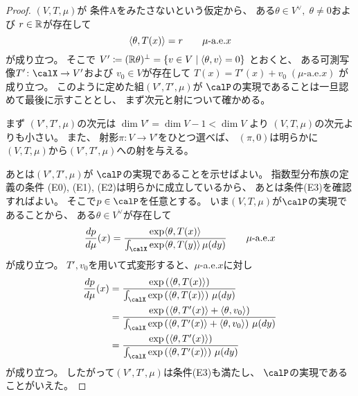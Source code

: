 \documentclass[report]{jlreq}
\begin{document}
\begin{proof}
    $(V, T, \mu)$が
    条件Aをみたさないという仮定から、
    ある$\theta \in V^\vee, \; \theta \neq 0$および
    $r \in \mathbb{R}$が存在して
    \begin{equation}
        \locallabel{eq:costant-pairing}
        \langle \theta, T(x) \rangle
            = r
            \qquad
            \text{$\mu$-a.e.$x$}
    \end{equation}
    が成り立つ。
    そこで
    $V' \coloneqq (\mathbb{R}\theta)^\perp
        = \{ v \in V \mid \langle \theta, v \rangle = 0 \}$
    とおくと、
    ある可測写像$T' \colon \calX \to V'$および
    $v_0 \in V$が存在して
    $T(x) = T'(x) + v_0 \; (\text{$\mu$-a.e.$x$})$
    が成り立つ。
    このように定めた組$(V', T', \mu)$が
    $\calP$の実現であることは一旦認めて最後に示すこととし、
    まず次元と射について確かめる。

    まず
    $(V', T', \mu)$の次元は
    $\dim V' = \dim V - 1 < \dim V$
    より
    $(V, T, \mu)$の次元よりも小さい。
    また、
    射影$\pi \colon V \to V'$をひとつ選べば、
    $(\pi, 0)$は明らかに
    $(V, T, \mu)$から$(V', T', \mu)$への射を与える。

    あとは$(V', T', \mu)$が
    $\calP$の実現であることを示せばよい。
    指数型分布族の定義の条件
    (E0), (E1), (E2)は明らかに成立しているから、
    あとは条件(E3)を確認すればよい。
    そこで$p \in \calP$を任意とする。
    いま$(V, T, \mu)$が$\calP$の実現であることから、
    ある$\theta \in V^\vee$が存在して
    \begin{equation}
        \dd[p]{\mu}(x)
            = \frac{
                \exp\langle \theta, T(x) \rangle
            }{
                \int_{\calX} \exp\langle \theta, T(y) \rangle \, \mu(dy)
            }
            \qquad
            \text{$\mu$-a.e.$x$}
    \end{equation}
    が成り立つ。
    $T', v_0$を用いて式変形すると、$\mu$-a.e.$x$に対し
    \begin{alignat}{1}
        \dd[p]{\mu}(x)
            &= \frac{
                \exp\myparen{
                    \langle \theta, T(x) \rangle
                }
            }{
                \int_{\calX} \exp\myparen{
                    \langle \theta, T(x) \rangle
                } \, \mu(dy)
            } \\
            &= \frac{
                \exp\myparen{
                    \langle \theta, T'(x) \rangle
                    + \langle \theta, v_0 \rangle
                }
            }{
                \int_{\calX} \exp\myparen{
                    \langle \theta, T'(x) \rangle
                    + \langle \theta, v_0 \rangle
                } \, \mu(dy)
            } \\
            &= \frac{
                \exp\myparen{
                    \langle \theta, T'(x) \rangle
                }
            }{
                \int_{\calX} \exp\myparen{
                    \langle \theta, T'(x) \rangle
                } \, \mu(dy)
            }
    \end{alignat}
    が成り立つ。
    したがって$(V', T', \mu)$は条件(E3)も満たし、
    $\calP$の実現であることがいえた。
\end{proof}
\end{document}
